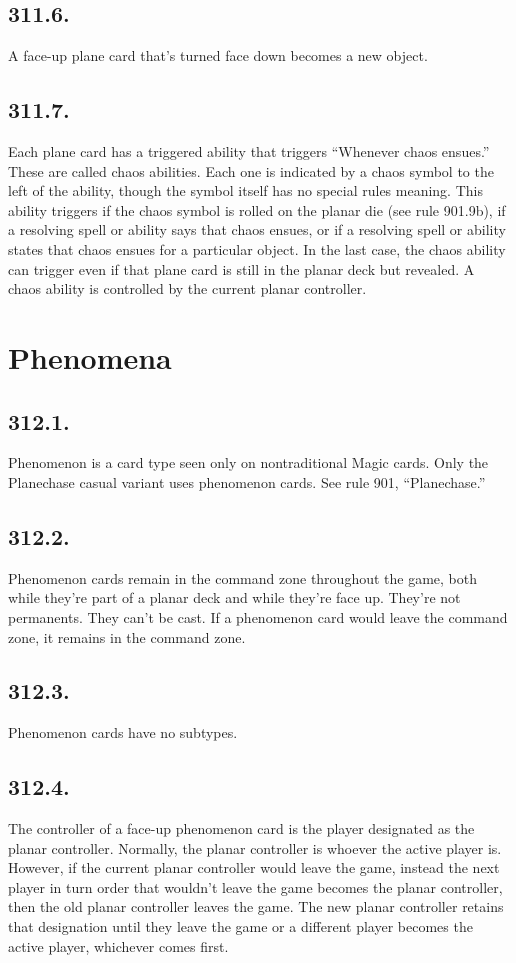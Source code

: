 \subsection*{311.6.}
A face-up plane card that’s turned face down becomes a new object.

\subsection*{311.7.}
Each plane card has a triggered ability that triggers “Whenever chaos ensues.” These are called chaos abilities. Each one is indicated by a chaos symbol to the left of the ability, though the symbol itself has no special rules meaning. This ability triggers if the chaos symbol is rolled on the planar die (see rule 901.9b), if a resolving spell or ability says that chaos ensues, or if a resolving spell or ability states that chaos ensues for a particular object. In the last case, the chaos ability can trigger even if that plane card is still in the planar deck but revealed. A chaos ability is controlled by the current planar controller.

\section{Phenomena}
\subsection*{312.1.}
Phenomenon is a card type seen only on nontraditional Magic cards. Only the Planechase casual variant uses phenomenon cards. See rule 901, “Planechase.”

\subsection*{312.2.}
Phenomenon cards remain in the command zone throughout the game, both while they’re part of a planar deck and while they’re face up. They’re not permanents. They can’t be cast. If a phenomenon card would leave the command zone, it remains in the command zone.

\subsection*{312.3.}
Phenomenon cards have no subtypes.

\subsection*{312.4.}
The controller of a face-up phenomenon card is the player designated as the planar controller. Normally, the planar controller is whoever the active player is. However, if the current planar controller would leave the game, instead the next player in turn order that wouldn’t leave the game becomes the planar controller, then the old planar controller leaves the game. The new planar controller retains that designation until they leave the game or a different player becomes the active player, whichever comes first.

